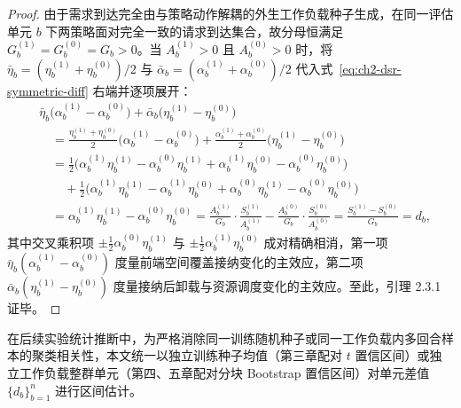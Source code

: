 \begin{proof}
由于需求到达完全由与策略动作解耦的外生工作负载种子生成，在同一评估单元 $b$ 下两策略面对完全一致的请求到达集合，故分母恒满足 $G_b^{(1)}=G_b^{(0)}=G_b>0$。当 $A_b^{(1)}>0$ 且 $A_b^{(0)}>0$ 时，将 $\bar{\eta}_b=(\eta_b^{(1)}+\eta_b^{(0)})/2$ 与 $\bar{\alpha}_b=(\alpha_b^{(1)}+\alpha_b^{(0)})/2$ 代入式~\eqref{eq:ch2-dsr-symmetric-diff} 右端并逐项展开：
\begin{align*}
    &\bar{\eta}_b\big(\alpha_b^{(1)}-\alpha_b^{(0)}\big)+\bar{\alpha}_b\big(\eta_b^{(1)}-\eta_b^{(0)}\big) \\
    &\quad=\frac{\eta_b^{(1)}+\eta_b^{(0)}}{2}\big(\alpha_b^{(1)}-\alpha_b^{(0)}\big)
      +\frac{\alpha_b^{(1)}+\alpha_b^{(0)}}{2}\big(\eta_b^{(1)}-\eta_b^{(0)}\big) \\
    &\quad=\frac{1}{2}\Big(\alpha_b^{(1)}\eta_b^{(1)}-\alpha_b^{(0)}\eta_b^{(1)}+\alpha_b^{(1)}\eta_b^{(0)}-\alpha_b^{(0)}\eta_b^{(0)}\Big) \\
    &\qquad+\frac{1}{2}\Big(\alpha_b^{(1)}\eta_b^{(1)}-\alpha_b^{(1)}\eta_b^{(0)}+\alpha_b^{(0)}\eta_b^{(1)}-\alpha_b^{(0)}\eta_b^{(0)}\Big) \\
    &\quad=\alpha_b^{(1)}\eta_b^{(1)}-\alpha_b^{(0)}\eta_b^{(0)}
      =\frac{A_b^{(1)}}{G_b}\cdot\frac{S_b^{(1)}}{A_b^{(1)}}-\frac{A_b^{(0)}}{G_b}\cdot\frac{S_b^{(0)}}{A_b^{(0)}}
      =\frac{S_b^{(1)}-S_b^{(0)}}{G_b}=d_b,
\end{align*}
其中交叉乘积项 $\pm\frac{1}{2}\alpha_b^{(0)}\eta_b^{(1)}$ 与 $\pm\frac{1}{2}\alpha_b^{(1)}\eta_b^{(0)}$ 成对精确相消，第一项 $\bar{\eta}_b(\alpha_b^{(1)}-\alpha_b^{(0)})$ 度量前端空间覆盖接纳变化的主效应，第二项 $\bar{\alpha}_b(\eta_b^{(1)}-\eta_b^{(0)})$ 度量接纳后卸载与资源调度变化的主效应。至此，引理 2.3.1 证毕。
\end{proof}
在后续实验统计推断中，为严格消除同一训练随机种子或同一工作负载内多回合样本的聚类相关性\cite{agarwal2021deep}，本文统一以独立训练种子均值（第三章配对 $t$ 置信区间）或独立工作负载整群单元（第四、五章配对分块 Bootstrap 置信区间）对单元差值 $\{d_b\}_{b=1}^n$ 进行区间估计。


